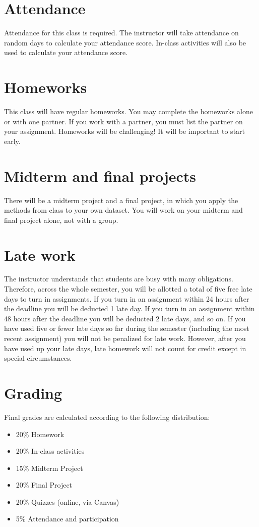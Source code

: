 \documentclass[10pt]{memoir}
\begin{document}
\section{\textbf{Attendance}}
Attendance for this class is required. 
The instructor will take attendance on random days to calculate your attendance score.
In-class activities will also be used to calculate your attendance score.

\section{\textbf{Homeworks}}
This class will have regular homeworks. 
You may complete the homeworks alone or with one partner. 
If you work with a partner, you must list the partner on your assignment. 
Homeworks will be challenging! It will be important to start early.

\section{\textbf{Midterm and final projects}}
There will be a midterm project and a final project, in which you apply the methods from class to your own dataset.
You will work on your midterm and final project alone, not with a group.

\section{\textbf{Late work}}
The instructor understands that students are busy with many obligations. 
Therefore, across the whole semester, you will be allotted a total of five free late days to turn in assignments. 
If you turn in an assignment within 24 hours after the deadline you will be deducted 1 late day. 
If you turn in an assignment within 48 hours after the deadline you will be deducted 2 late days, and so on. 
If you have used five or fewer late days so far during the semester (including the most recent assignment) you will not be penalized for late work. 
However, after you have used up your late days, late homework will not count for credit except in special circumstances.

\section{\textbf{Grading}}

Final grades are calculated according to the following distribution:
\begin{itemize}
\item 20\% Homework
\item 20\% In-class activities
\item 15\% Midterm Project
\item 20\% Final Project
\item 20\% Quizzes (online, via Canvas)
\item 5\% Attendance and participation
\end{itemize}
\end{document}
